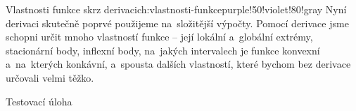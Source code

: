 \begin{chapterintro}{Vlastnosti funkce skrz derivaci}{ch:vlastnosti-funkce}{purple!50!violet!80!gray}{}
    Nyní derivaci skutečně poprvé použijeme na~složitější výpočty. Pomocí derivace
    jsme schopni určit mnoho vlastností funkce -- její lokální a~globální extrémy,
    stacionární body, inflexní body, na~jakých intervalech je funkce konvexní
    a~na~kterých konkávní, a~spousta dalších vlastností, které bychom bez derivace
    určovali velmi těžko.
\end{chapterintro}

\begin{exercise}
    Testovací úloha
\end{exercise}

